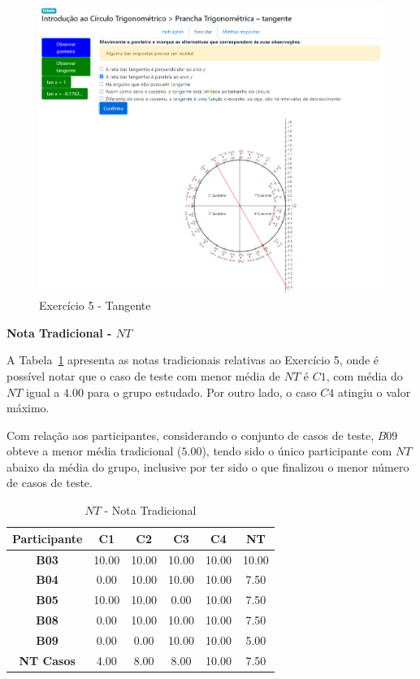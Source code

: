 \begin{figure}[htb]
	\centering
	\includegraphics[width=0.95\linewidth]{chapters/results/Fase 3/E5_Virtual.png}
	\caption{Exercício 5 - Tangente}
	\label{fig:E5}
\end{figure}

\textbf{Nota Tradicional - $NT$}

A Tabela~\ref{tab:F3_A5_NT} apresenta as notas tradicionais relativas ao Exercício 5, onde é possível notar que o caso de teste com menor média de $NT$ é $C1$, com média do $NT$ igual a $4.00$ para o grupo estudado. Por outro lado, o caso $C4$ atingiu o valor máximo.

Com relação aos participantes, considerando o conjunto de casos de teste, $B09$ obteve a menor média tradicional ($5.00$), tendo sido o único participante com $NT$ abaixo da média do grupo, inclusive por ter sido o que finalizou o menor número de casos de teste.

\begin{table}[htbp]
	\centering
	\caption{$NT$ - Nota Tradicional}
	\begin{tabular}{|c|c|c|c|c|c|}
		\hline
		\rowcolor[HTML]{D9D9D9} 
		\textbf{Participante} & \textbf{C1} & \textbf{C2} & \textbf{C3} & \textbf{C4} & \textbf{NT} \\ \hline
		\rowcolor[HTML]{FFFFFF} 
		\textbf{B03} & 10.00 & 10.00 & 10.00 & 10.00 & 10.00 \\ \hline
		\rowcolor[HTML]{E7E6E6} 
		\textbf{B04} & 0.00 & 10.00 & 10.00 & 10.00 & 7.50 \\ \hline
		\rowcolor[HTML]{FFFFFF} 
		\textbf{B05} & 10.00 & 10.00 & 0.00 & 10.00 & 7.50 \\ \hline
		\rowcolor[HTML]{E7E6E6} 
		\textbf{B08} & 0.00 & 10.00 & 10.00 & 10.00 & 7.50 \\ \hline
		\rowcolor[HTML]{FFFFFF} 
		\textbf{B09} & 0.00 & 0.00 & 10.00 & 10.00 & 5.00 \\ \hline
		\rowcolor[HTML]{D9D9D9} 
		\textbf{NT Casos} & 4.00 & 8.00 & 8.00 & 10.00 & 7.50 \\ \hline
	\end{tabular}
	\label{tab:F3_A5_NT}
\end{table}

